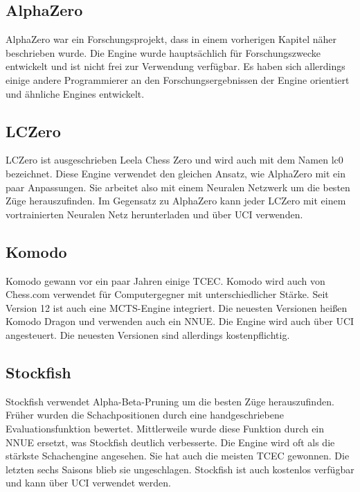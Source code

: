 \subsection{AlphaZero}
AlphaZero war ein Forschungsprojekt, dass in einem vorherigen Kapitel näher beschrieben wurde. Die Engine wurde hauptsächlich für Forschungszwecke entwickelt und ist nicht frei zur Verwendung verfügbar. Es haben sich allerdings einige andere Programmierer an den Forschungsergebnissen der Engine orientiert und ähnliche Engines entwickelt.

\subsection{LCZero}
LCZero ist ausgeschrieben Leela Chess Zero und wird auch mit dem Namen lc0 bezeichnet. Diese Engine verwendet den gleichen Ansatz, wie AlphaZero mit ein paar Anpassungen. Sie arbeitet also mit einem Neuralen Netzwerk um die besten Züge herauszufinden. Im Gegensatz zu AlphaZero kann jeder LCZero mit einem vortrainierten Neuralen Netz herunterladen und über \ac{UCI} verwenden.
\cite{noauthor_neural_2020}

\subsection{Komodo}
Komodo gewann vor ein paar Jahren einige \ac{TCEC}. Komodo wird auch von Chess.com verwendet für Computergegner mit unterschiedlicher Stärke. Seit Version 12 ist auch eine \ac{MCTS}-Engine integriert. Die neuesten Versionen heißen Komodo Dragon und verwenden auch ein \ac{NNUE}. Die Engine wird auch über \ac{UCI} angesteuert. Die neuesten Versionen sind allerdings kostenpflichtig.
\cite{wikipedia_foundation_inc_komodo_2024}

\subsection{Stockfish}
Stockfish verwendet Alpha-Beta-Pruning um die besten Züge herauszufinden. Früher wurden die Schachpositionen durch eine handgeschriebene Evaluationsfunktion bewertet. Mittlerweile wurde diese Funktion durch ein \ac{NNUE} ersetzt, was Stockfish deutlich verbesserte. Die Engine wird oft als die stärkste Schachengine angesehen. Sie hat auch die meisten \ac{TCEC} gewonnen. Die letzten sechs Saisons blieb sie ungeschlagen. Stockfish ist auch kostenlos verfügbar und kann über \ac{UCI} verwendet werden.
\cite{wikipedia_foundation_inc_stockfish_2025}

